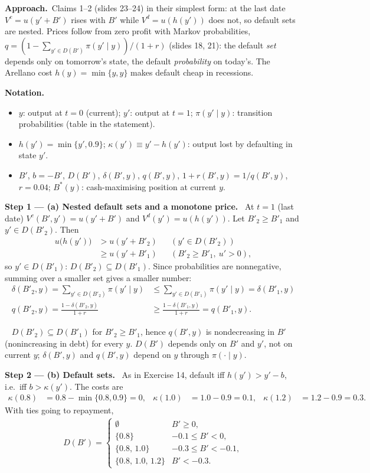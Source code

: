 \documentclass[11pt,a4paper]{article}
\newcommand{\notation}{\par\noindent\textbf{Notation.}}
\newcommand{\step}[2]{\par\medskip\noindent\textbf{Step #1 --- #2.}~}
\newcommand{\approach}{\par\smallskip\noindent\textbf{Approach.}~}
\newcommand{\answer}[1]{\par\smallskip\noindent\fbox{\textbf{Answer #1.}}~}
\begin{document}
\approach Claims 1--2 (slides 23--24) in their simplest form: at the last date $V^c=u(y'+B')$ rises with $B'$ while $V^d=u(h(y'))$ does not, so default
sets are nested. Prices follow from zero profit with Markov probabilities, $q=(1-\sum_{y'\in D(B')}\pi(y'\mid y))/(1+r)$ (slides 18, 21): the default
\emph{set} depends only on tomorrow's state, the default \emph{probability} on today's. The Arellano cost $h(y)=\min\{y,\hat y\}$ makes default cheap in
recessions.

\notation
\begin{itemize}
  \item $y$: output at $t=0$ (current); $y'$: output at $t=1$; $\pi(y'\mid y)$: transition probabilities (table in the statement).
  \item $h(y')=\min\{y',0.9\}$; $\kappa(y')\equiv y'-h(y')$: output lost by defaulting in state $y'$.
  \item $B'$, $b=-B'$, $D(B')$, $\delta(B',y)$, $q(B',y)$, $1+r(B',y)=1/q(B',y)$, $r=0.04$; $B^*(y)$: cash-maximising position at current $y$.
\end{itemize}

\step{1}{(a) Nested default sets and a monotone price} At $t=1$ (last date) $V^c(B',y')=u(y'+B')$ and $V^d(y')=u(h(y'))$. Let $B'_2\ge B'_1$ and
$y'\in D(B'_2)$. Then
\begin{align}
  u\big(h(y')\big) &> u(y'+B'_2) && (y'\in D(B'_2)) \nonumber\\
                   &\ge u(y'+B'_1) && (B'_2\ge B'_1,\ u'>0), \nonumber
\end{align}
so $y'\in D(B'_1)$: $D(B'_2)\subseteq D(B'_1)$. Since probabilities are nonnegative, summing over a smaller set gives a smaller number:
\begin{align}
  \delta(B'_2,y) = \sum_{y'\in D(B'_2)}\pi(y'\mid y) &\le \sum_{y'\in D(B'_1)}\pi(y'\mid y) = \delta(B'_1,y) \nonumber\\
  q(B'_2,y) = \frac{1-\delta(B'_2,y)}{1+r} &\ge \frac{1-\delta(B'_1,y)}{1+r} = q(B'_1,y). \label{t5e15-mono}
\end{align}

\answer{(a)} $D(B'_2)\subseteq D(B'_1)$ for $B'_2\ge B'_1$, hence $q(B',y)$ is nondecreasing in $B'$ (nonincreasing in debt) for every $y$. $D(B')$ depends only
on $B'$ and $y'$, not on current $y$; $\delta(B',y)$ and $q(B',y)$ depend on $y$ through $\pi(\cdot\mid y)$.

\step{2}{(b) Default sets} As in Exercise 14, default iff $h(y')>y'-b$, i.e.\ iff $b>\kappa(y')$. The costs are
\begin{align}
  \kappa(0.8) &= 0.8-\min\{0.8,0.9\} = 0, & \kappa(1.0) &= 1.0-0.9 = 0.1, & \kappa(1.2) &= 1.2-0.9 = 0.3. \nonumber
\end{align}
With ties going to repayment,
\begin{align}
  D(B') = \begin{cases} \emptyset & B'\ge0,\\ \{0.8\} & -0.1\le B'<0,\\ \{0.8,\,1.0\} & -0.3\le B'<-0.1,\\ \{0.8,\,1.0,\,1.2\} & B'<-0.3. \end{cases} \label{t5e15-D}
\end{align}
\end{document}
